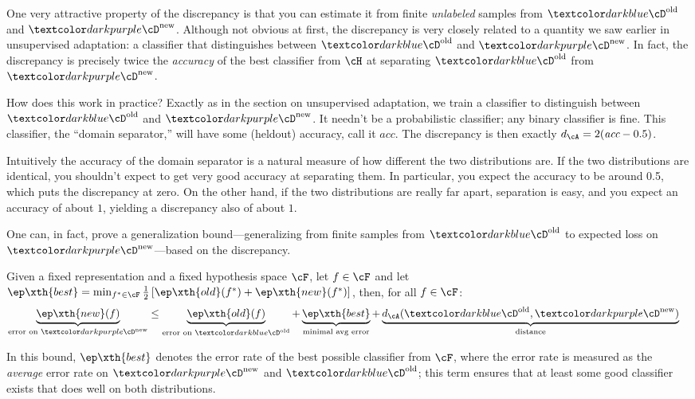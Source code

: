 One very attractive property of the discrepancy is that you can estimate it from finite \emph{unlabeled} samples from $\Dold$ and $\Dnew$.
Although not obvious at first, the discrepancy is very closely related to a quantity we saw earlier in unsupervised adaptation: a classifier that distinguishes between $\Dold$ and $\Dnew$.
In fact, the discrepancy is precisely twice the \emph{accuracy} of the best classifier from $\cH$ at separating $\Dold$ from $\Dnew$.

How does this work in practice?
Exactly as in the section on unsupervised adaptation, we train a classifier to distinguish between $\Dold$ and $\Dnew$.
It needn't be a probabilistic classifier; any binary classifier is fine.
This classifier, the ``domain separator,'' will have some (heldout) accuracy, call it $\textit{acc}$.
The discrepancy is then exactly $d_\cA = 2 (\textit{acc} - 0.5)$.

Intuitively the accuracy of the domain separator is a natural measure of how different the two distributions are.
If the two distributions are identical, you shouldn't expect to get very good accuracy at separating them.
In particular, you expect the accuracy to be around 0.5, which puts the discrepancy at zero.
On the other hand, if the two distributions are really far apart, separation is easy, and you expect an accuracy of about $1$, yielding a discrepancy also of about $1$.

One can, in fact, prove a generalization bound---generalizing from finite samples from $\Dold$ to expected loss on $\Dnew$---based on the discrepancy.
%
\begin{theorem} \label{thm:bias:adapt}
  Given a fixed representation and a fixed hypothesis space $\cF$, let $f \in \cF$ and let $\ep\xth{best} = \min_{f^* \in \cF} \frac 1 2 \left[ \ep\xth{old}(f^*) + \ep\xth{new}(f^*) \right]$, then, for all $f \in \cF$:
%
\begin{align}
  \underbrace{\ep\xth{new}(f)}_{\textrm{error on } \Dnew}
  &\leq
    \underbrace{\ep\xth{old}(f)}_{\textrm{error on } \Dold} +
    \underbrace{\ep\xth{best}}_{\textrm{minimal avg error}} +
    \underbrace{d_\cA(\Dold,\Dnew)}_{\textrm{distance}}
\end{align}
\end{theorem}
%
In this bound, $\ep\xth{best}$ denotes the error rate of the best possible classifier from $\cF$, where the error rate is measured as the \emph{average} error rate on $\Dnew$ and $\Dold$; this term ensures that at least some good classifier exists that does well on both distributions.

